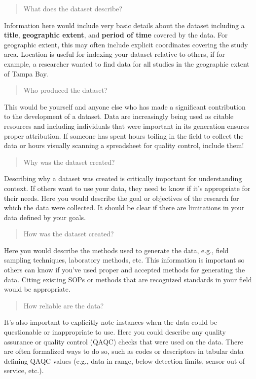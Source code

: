 \documentclass[
  letterpaper,
  DIV=11,
  numbers=noendperiod]{scrreprt}
\begin{document}
\begin{quote}
What does the dataset describe?
\end{quote}

Information here would include very basic details about the dataset
including a \textbf{title}, \textbf{geographic extent}, and
\textbf{period of time} covered by the data. For geographic extent, this
may often include explicit coordinates covering the study area. Location
is useful for indexing your dataset relative to others, if for example,
a researcher wanted to find data for all studies in the geographic
extent of Tampa Bay.

\begin{quote}
Who produced the dataset?
\end{quote}

This would be yourself and anyone else who has made a significant
contribution to the development of a dataset. Data are increasingly
being used as citable resources and including individuals that were
important in its generation ensures proper attribution. If someone has
spent hours toiling in the field to collect the data or hours visually
scanning a spreadsheet for quality control, include them!

\begin{quote}
Why was the dataset created?
\end{quote}

Describing why a dataset was created is critically important for
understanding context. If others want to use your data, they need to
know if it's appropriate for their needs. Here you would describe the
goal or objectives of the research for which the data were collected. It
should be clear if there are limitations in your data defined by your
goals.

\begin{quote}
How was the dataset created?
\end{quote}

Here you would describe the methods used to generate the data, e.g.,
field sampling techniques, laboratory methods, etc. This information is
important so others can know if you've used proper and accepted methods
for generating the data. Citing existing SOPs or methods that are
recognized standards in your field would be appropriate.

\begin{quote}
How reliable are the data?
\end{quote}

It's also important to explicitly note instances when the data could be
questionable or inappropriate to use. Here you could describe any
quality assurance or quality control (QAQC) checks that were used on the
data. There are often formalized ways to do so, such as codes or
descriptors in tabular data defining QAQC values (e.g., data in range,
below detection limits, sensor out of service, etc.).
\end{document}
